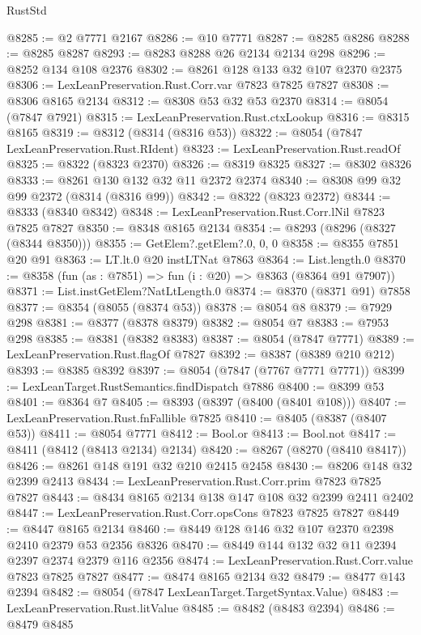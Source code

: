 \begin{lexlean}{RustStd}
\begin{coremodule}
@8285 := @2 @7771 @2167
@8286 := @10 @7771
@8287 := @8285 @8286
@8288 := @8285 @8287
@8293 := @8283 @8288 @26 @2134 @2134 @298
@8296 := @8252 @134 @108 @2376
@8302 := @8261 @128 @133 @32 @107 @2370 @2375
@8306 := LexLeanPreservation.Rust.Corr.var @7823 @7825 @7827
@8308 := @8306 @8165 @2134
@8312 := @8308 @53 @32 @53 @2370
@8314 := @8054 (@7847 @7921)
@8315 := LexLeanPreservation.Rust.ctxLookup
@8316 := @8315 @8165
@8319 := @8312 (@8314 (@8316 @53))
@8322 := @8054 (@7847 LexLeanPreservation.Rust.RIdent)
@8323 := LexLeanPreservation.Rust.readOf
@8325 := @8322 (@8323 @2370)
@8326 := @8319 @8325
@8327 := @8302 @8326
@8333 := @8261 @130 @132 @32 @11 @2372 @2374
@8340 := @8308 @99 @32 @99 @2372 (@8314 (@8316 @99))
@8342 := @8322 (@8323 @2372)
@8344 := @8333 (@8340 @8342)
@8348 := LexLeanPreservation.Rust.Corr.lNil @7823 @7825 @7827
@8350 := @8348 @8165 @2134
@8354 := @8293 (@8296 (@8327 (@8344 @8350)))
@8355 := GetElem?.getElem?.{0, 0, 0}
@8358 := @8355 @7851 @20 @91
@8363 := LT.lt.{0} @20 instLTNat @7863
@8364 := List.length.{0}
@8370 := @8358 (fun (as : @7851) => fun (i : @20) => @8363 (@8364 @91 @7907))
@8371 := List.instGetElem?NatLtLength.{0}
@8374 := @8370 (@8371 @91) @7858
@8377 := @8354 (@8055 (@8374 @53))
@8378 := @8054 @8
@8379 := @7929 @298
@8381 := @8377 (@8378 @8379)
@8382 := @8054 @7
@8383 := @7953 @298
@8385 := @8381 (@8382 @8383)
@8387 := @8054 (@7847 @7771)
@8389 := LexLeanPreservation.Rust.flagOf @7827
@8392 := @8387 (@8389 @210 @212)
@8393 := @8385 @8392
@8397 := @8054 (@7847 (@7767 @7771 @7771))
@8399 := LexLeanTarget.RustSemantics.findDispatch @7886
@8400 := @8399 @53
@8401 := @8364 @7
@8405 := @8393 (@8397 (@8400 (@8401 @108)))
@8407 := LexLeanPreservation.Rust.fnFallible @7825
@8410 := @8405 (@8387 (@8407 @53))
@8411 := @8054 @7771
@8412 := Bool.or
@8413 := Bool.not
@8417 := @8411 (@8412 (@8413 @2134) @2134)
@8420 := @8267 (@8270 (@8410 @8417))
@8426 := @8261 @148 @191 @32 @210 @2415 @2458
@8430 := @8206 @148 @32 @2399 @2413
@8434 := LexLeanPreservation.Rust.Corr.prim @7823 @7825 @7827
@8443 := @8434 @8165 @2134 @138 @147 @108 @32 @2399 @2411 @2402
@8447 := LexLeanPreservation.Rust.Corr.opsCons @7823 @7825 @7827
@8449 := @8447 @8165 @2134
@8460 := @8449 @128 @146 @32 @107 @2370 @2398 @2410 @2379 @53 @2356 @8326
@8470 := @8449 @144 @132 @32 @11 @2394 @2397 @2374 @2379 @116 @2356
@8474 := LexLeanPreservation.Rust.Corr.value @7823 @7825 @7827
@8477 := @8474 @8165 @2134 @32
@8479 := @8477 @143 @2394
@8482 := @8054 (@7847 LexLeanTarget.TargetSyntax.Value)
@8483 := LexLeanPreservation.Rust.litValue
@8485 := @8482 (@8483 @2394)
@8486 := @8479 @8485

\end{coremodule}
\end{lexlean}
